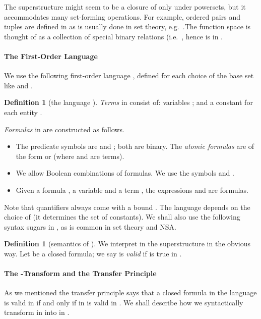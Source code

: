 \documentclass[envcountsect,orivec]{llncs} \pdfoutput=1
\theoremstyle{definition}
\newtheorem{mydef}[mythm]{Definition}
\begin{document}
The superstructure  might seem to be a closure of  only under powersets, but it accommodates many set-forming operations.
For example, ordered pairs  and tuples  are 
defined in  as is usually done in set theory, e.g.\
.The function space  is
thought of as a collection of special binary relations (i.e.\ ,  hence is in .

\paragraph{The First-Order Language }
We use the following 
first-order language , defined for each choice of the base set 
 like  and .
\begin{mydef}[the language ]\label{definition:languageLX}
 \emph{Terms} in  consist of: variables ;
 and a constant  for each entity . 

\emph{Formulas} in  are constructed as follows.
\begin{itemize}
 \item The predicate symbols are  and ; both are binary. The
       \emph{atomic formulas} are of the form  or  (where 
       and  are terms).
 \item We allow  Boolean combinations of formulas. We use the
       symbols
        and .
 \item Given a formula , a variable  and a term , the expressions
     and     
       are formulas. 
\end{itemize}
\end{mydef}
\noindent Note that
quantifiers always come with a bound .
 The language  depends on the choice of  (it
  determines the set of constants). 
We shall also  use
 the following syntax sugars in , as is common in set theory and NSA.  







\begin{mydef}[semantics of ]\label{definition:semanticsOfLX}
 We interpret  in the superstructure  in the obvious way.
Let  be a  closed formula;  we say  is \emph{valid}
if  is true in .
\end{mydef}


\paragraph{The -Transform and the Transfer Principle}
 As we mentioned the transfer principle says that a closed formula 
 in the language  is valid in  if and only if  in
  is valid in .
  We shall describe how we syntactically transform
 in  into
  in . 
\end{document}
